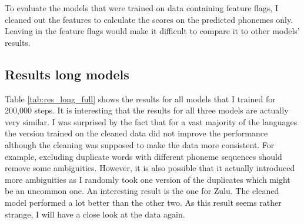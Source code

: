 To evaluate the models that were trained on data containing feature flags, I cleaned out the features to calculate the scores on the predicted phonemes only. Leaving in the feature flags would make it difficult to compare it to other models' results.

\subsection{Results long models}

Table \ref{tab:res_long_full} shows the results for all models that I trained for 200,000 steps. It is interesting that the results for all three models are actually very similar. I was surprised by the fact that for a vast majority of the languages the version trained on the cleaned data did not improve the performance although the cleaning was supposed to make the data more consistent. For example, excluding duplicate words with different phoneme sequences should remove some ambiguities. However, it is also possible that it actually introduced more ambiguities as I randomly took one version of the duplicates which might be an uncommon one. An interesting result is the one for Zulu. The cleaned model performed a lot better than the other two. As this result seems rather strange, I will have a close look at the data again.

